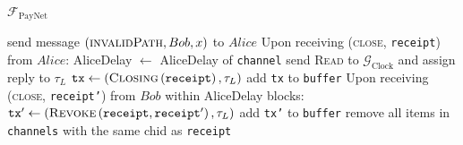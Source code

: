 \begin{functionality}{$\mathcal{F}_{\mathrm{PayNet}}$}
\begin{algorithmic}[1]
      \Else
        \State send message $\left(\textsc{invalidPath}, Bob, x\right)$ to
        $Alice$
      \EndIf
    \EndIndent
    \State
    \State Upon receiving (\textsc{close}, \texttt{receipt}) from $Alice$:
    \Indent
        \State AliceDelay $\gets$ AliceDelay of \texttt{channel}
        \State send \textsc{Read} to $\mathcal{G}_{\mathrm{Clock}}$ and assign
        reply to $\tau_L$
        \State $\mathtt{tx} \gets
        \left(\textsc{Closing}\left(\mathtt{receipt}\right), \tau_L\right)$
        \State add \texttt{tx} to \texttt{buffer}
        \State Upon receiving (\textsc{close}, \texttt{receipt'}) from $Bob$
        within AliceDelay blocks:
          \State $\mathtt{tx'} \gets
          \left(\textsc{Revoke}\left(\mathtt{receipt}, \mathtt{receipt'}\right),
          \tau_L\right)$
          \State add \texttt{tx'} to \texttt{buffer} 
        \EndIf
        \State remove all items in \texttt{channels} with the same chid as
        \texttt{receipt}
      \EndIf
    \EndIndent
  \end{algorithmic}
\end{functionality}

